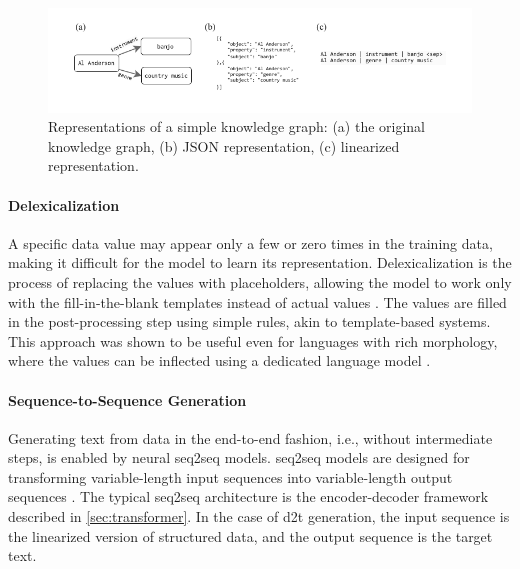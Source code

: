 {\begin{figure}[h]
    \centering
    \includegraphics[width=\textwidth]{img/linearization.pdf}

    \caption{Representations of a simple knowledge graph: (a) the original knowledge graph, (b) JSON representation, (c) linearized representation.}\label{fig:linearization}

\end{figure}


\paragraph{Delexicalization} A specific data value may appear only a few or zero times in the training data, making it difficult for the model to learn its representation. Delexicalization is the process of replacing the values with placeholders, allowing the model to work only with the fill-in-the-blank templates instead of actual values \cite{oh2000stochastic,mairesse2010phrase,wen2015semantically,dusekSequencetoSequenceGenerationSpoken2016}. The values are filled in the post-processing step using simple rules, akin to template-based systems. This approach was shown to be useful even for languages with rich morphology, where the values can be inflected using a dedicated language model \cite{duvsek2019neural}.

\paragraph{Sequence-to-Sequence Generation} Generating text from data in the end-to-end fashion, i.e., without intermediate steps, is enabled by neural \ac{seq2seq} models. \Ac{seq2seq} models are designed for transforming variable-length input sequences into variable-length output sequences \cite{cho2014learning,sutskever2014sequence}. The typical \ac{seq2seq} architecture is the encoder-decoder framework described in \autoref{sec:transformer}. In the case of \ac{d2t} generation, the input sequence is the linearized version of structured data, and the output sequence is the target text.

}
